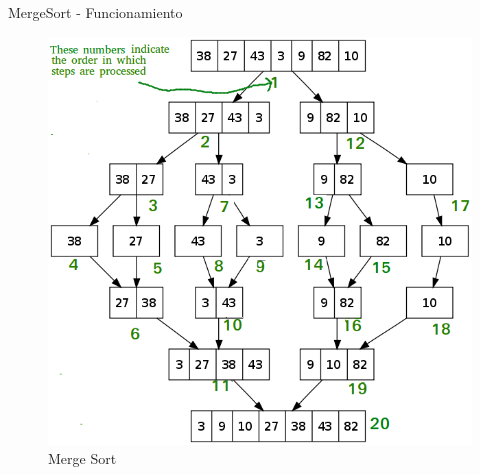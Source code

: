 \documentclass[11pt]{beamer}
\begin{document}
		\begin{frame}{MergeSort - Funcionamiento}
		     \begin{figure}[H]
				\centering
				\includegraphics[scale=0.30]{img/mergesort.png}
				\caption{Merge Sort}
				\label{fig:merge_sort_img1}
			\end{figure}
		\end{frame}
\end{document}

